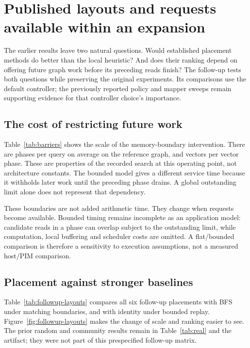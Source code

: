 \section{Published layouts and requests available within an expansion}
\label{sec:followup-results}
The earlier results leave two natural questions. Would established placement methods do better than the local heuristic? And does their ranking depend on offering future graph work before its preceding reads finish? The follow-up tests both questions while preserving the original experiments. Its comparisons use the default controller; the previously reported policy and mapper sweeps remain supporting evidence for that controller choice's importance.

\subsection{The cost of restricting future work}
Table~\ref{tab:barriers} shows the scale of the memory-boundary intervention. There are \MeanPhasesPerQuery{} phases per query on average on the reference graph, and \MeanVectorsPerPhase{} vectors per vector phase. These are properties of the recorded search at this operating point, not architecture constants. The bounded model gives a different service time because it withholds later work until the preceding phase drains. A global outstanding limit alone does not represent that dependency.

\begin{table}[htbp]\centering\small
\caption[Effect of expansion boundaries]{Reference graph, ten splits. Query service intervals include gaps between phases. The final column is the paired completed-stream difference with a 95\% interval, comparing bounded with flat replay of the same layout.}\label{tab:barriers}
\resizebox{\textwidth}{!}{}
\end{table}

These boundaries are not added arithmetic time. They change when requests become available. Bounded timing remains incomplete as an application model: candidate reads in a phase can overlap subject to the outstanding limit, while computation, local buffering and scheduler costs are omitted. A flat/bounded comparison is therefore a sensitivity to execution assumptions, not a measured host/PIM comparison.

\subsection{Placement against stronger baselines}
Table~\ref{tab:followup-layouts} compares all six follow-up placements with BFS under matching boundaries, and with identity under bounded replay. Figure~\ref{fig:followup-layouts} makes the change of scale and ranking easier to see. The prior random and community results remain in Table~\ref{tab:real} and the artifact; they were not part of this prespecified follow-up matrix.

